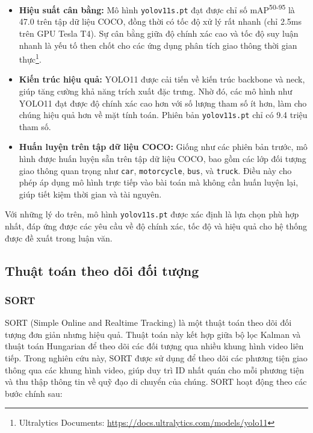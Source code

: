 \begin{itemize}
    \item \textbf{Hiệu suất cân bằng:} Mô hình \texttt{yolov11s.pt} đạt được chỉ số mAP\textsuperscript{50-95} là 47.0 trên tập dữ liệu COCO, đồng thời có tốc độ xử lý rất nhanh (chỉ 2.5ms trên GPU Tesla T4). Sự cân bằng giữa độ chính xác cao và tốc độ suy luận nhanh là yếu tố then chốt cho các ứng dụng phân tích giao thông thời gian thực\footnote[1]{Ultralytics Documents: \url{https://docs.ultralytics.com/models/yolo11}}.
    \item \textbf{Kiến trúc hiệu quả:} YOLO11 được cải tiến về kiến trúc backbone và neck, giúp tăng cường khả năng trích xuất đặc trưng. Nhờ đó, các mô hình như YOLO11 đạt được độ chính xác cao hơn với số lượng tham số ít hơn, làm cho chúng hiệu quả hơn về mặt tính toán. Phiên bản \texttt{yolov11s.pt} chỉ có 9.4 triệu tham số.
    \item \textbf{Huấn luyện trên tập dữ liệu COCO:} Giống như các phiên bản trước, mô hình được huấn luyện sẵn trên tập dữ liệu COCO, bao gồm các lớp đối tượng giao thông quan trọng như \texttt{car}, \texttt{motorcycle}, \texttt{bus}, và \texttt{truck}. Điều này cho phép áp dụng mô hình trực tiếp vào bài toán mà không cần huấn luyện lại, giúp tiết kiệm thời gian và tài nguyên.
\end{itemize}
Với những lý do trên, mô hình \texttt{yolov11s.pt} được xác định là lựa chọn phù hợp nhất, đáp ứng được các yêu cầu về độ chính xác, tốc độ và hiệu quả cho hệ thống được đề xuất trong luận văn.

\subsection{Thuật toán theo dõi đối tượng}
\subsubsection{SORT}
SORT (Simple Online and Realtime Tracking) là một thuật toán theo dõi đối tượng đơn giản nhưng hiệu quả. Thuật toán này kết hợp giữa bộ lọc Kalman và thuật toán Hungarian để theo dõi các đối tượng qua nhiều khung hình video liên tiếp. Trong nghiên cứu này, SORT được sử dụng để theo dõi các phương tiện giao thông qua các khung hình video, giúp duy trì ID nhất quán cho mỗi phương tiện và thu thập thông tin về quỹ đạo di chuyển của chúng. SORT hoạt động theo các bước chính sau:

